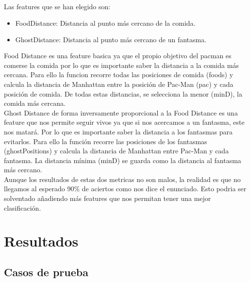 \documentclass{report}
\begin{document}
        \paragraph*{}{
          Las features que se han elegido son:
          \begin{itemize}
            \item FoodDistance: Distancia al punto más cercano de la comida.
            \item GhostDistance: Distancia al punto más cercano de un fantasma.
          \end{itemize}

          Food Distance es una feature basica ya que el propio objetivo del pacman es comerse la comida por lo que es importante saber la distancia a la comida más cercana. 
          Para ello la funcion recorre todas las posiciones de comida (foods) y calcula la distancia de Manhattan entre la posición de Pac-Man (pac) y cada posición de comida. De todas estas distancias, se selecciona la menor (minD), la comida más cercana.\\

          Ghost Distance de forma inversamente proporcional a la Food Distance es una feature que nos permite seguir vivos ya que si nos acercamos a un fantasma, este nos matará. Por lo que es importante saber la distancia a los fantasmas para evitarlos.
          Para ello la función recorre las posiciones de los fantasmas (ghostPositions) y calcula la distancia de Manhattan entre Pac-Man y cada fantasma. La distancia mínima (minD) se guarda como la distancia al fantasma más cercano.\\

          Aunque los resultados de estas dos metricas no son malos, la realidad es que no llegamos al esperado 90\% de aciertos como nos dice el enunciado. Esto podria ser solventado añadiendo más features que nos permitan tener una mejor clasificación.
        }
  \chapter{Resultados}
    \section{Casos de prueba}
\end{document}
